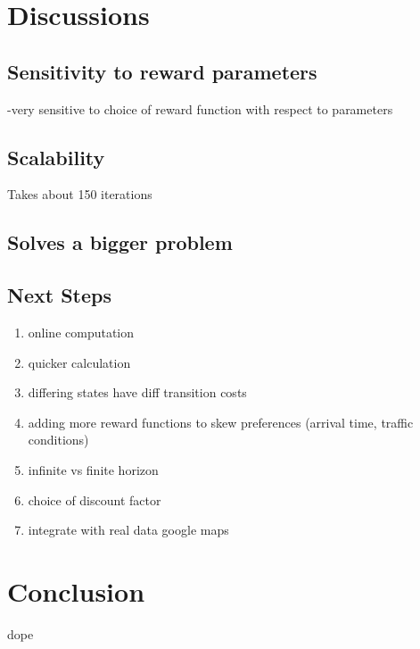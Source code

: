 \documentclass[10pt,twocolumn,letterpaper]{article}
\begin{document}
\section{Discussions}
\subsection{Sensitivity to reward parameters}
-very sensitive to choice of reward function with respect to parameters
\subsection{Scalability}
Takes about 150 iterations
\subsection{Solves a bigger problem}

\subsection{Next Steps}
\begin{enumerate}
\item online computation
\item quicker calculation
\item differing states have diff transition costs
\item adding more reward functions to skew preferences (arrival time, traffic conditions)
\item infinite vs finite horizon
\item choice of discount factor
\item integrate with real data google maps
\end{enumerate}


\section{Conclusion}

dope

{\small


}

\end{document}
